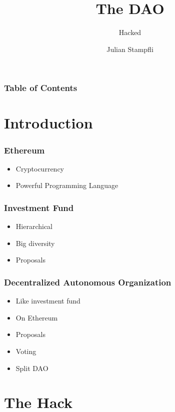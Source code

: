 \documentclass{beamer}
\begin{document}
\title{The DAO}
\subtitle{Hacked}
\author{Julian Stampfli}

\frame{\titlepage}

\begin{frame}
  \frametitle{Table of Contents}
  \tableofcontents
\end{frame}

\section{Introduction}


\begin{frame}[fragile]
  \frametitle{Ethereum}
  \begin{itemize}
    \item Cryptocurrency
    \item Powerful Programming Language
  \end{itemize}
\end{frame}


\begin{frame}[fragile]
  \frametitle{Investment Fund}
  \begin{itemize}
    \item Hierarchical
    \item Big diversity
    \item Proposals
  \end{itemize}
\end{frame}

\begin{frame}[fragile]
  \frametitle{Decentralized Autonomous Organization}
  \begin{itemize}
    \item Like investment fund
    \item On Ethereum
    \item Proposals
    \item Voting
    \item Split DAO
  \end{itemize}
\end{frame}

\section{The Hack}
\end{document}

